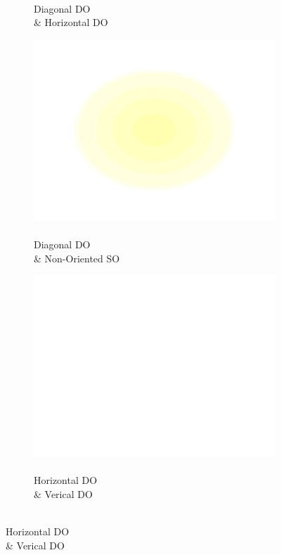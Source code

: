 \documentclass[journal,onecolumn]{IEEEtran}
\begin{document}
\begin{figure}[h]
\begin{subfigure}[b]{0.2\textwidth}
            \caption{\\ Diagonal DO \\ \& Horizontal DO}
    \end{subfigure}%
    \begin{subfigure}[b]{0.2\textwidth}
            \centering
            \captionsetup{justification=centering}
            \includegraphics[width=.85\linewidth]{j_2_4}
            \caption{\\ Diagonal DO \\ \& Non-Oriented SO}
    \end{subfigure}%
    \par \bigskip
    \begin{subfigure}[b]{0.2\textwidth}
            \centering
            \captionsetup{justification=centering}
            \includegraphics[width=.85\linewidth]{j_blank}
            \caption{\\ Horizontal DO \\ \& Verical DO}

\end{subfigure}
\end{figure}
\end{document}
